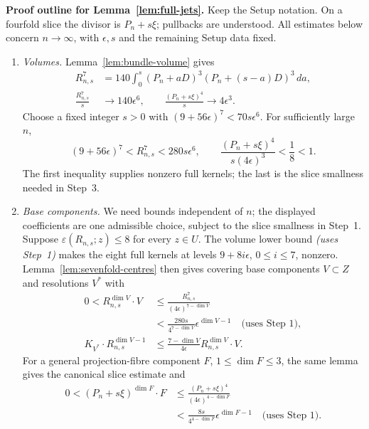 \documentclass[12pt,a4paper,psamsfonts]{amsart}
\theoremstyle{definition}
\theoremstyle{plain}
\begin{document}
\medskip
\noindent\textbf{Proof outline for Lemma~\ref{lem:full-jets}.}
Keep the Setup notation. On a fourfold slice the divisor is
$P_n+s\xi$; pullbacks are understood. All estimates below concern
$n\to\infty$, with $\epsilon,s$ and the remaining Setup data fixed.
\begin{enumerate}
\item \emph{Volumes.} Lemma~\ref{lem:bundle-volume} gives
\[
 \begin{split}
 R_{n,s}^7
  &=140\int_0^s(P_n+aD)^3(P_n+(s-a)D)^3\,da,\\
 \frac{R_{n,s}^7}s&\longrightarrow140\epsilon^6,\qquad
 \frac{(P_n+s\xi)^4}s\longrightarrow4\epsilon^3.
 \end{split}
\]
Choose a fixed integer $s>0$ with $(9+56\epsilon)^7<70s\epsilon^6$.
For sufficiently large $n$,
\[
 (9+56\epsilon)^7<R_{n,s}^7<280s\epsilon^6,\qquad
 \frac{(P_n+s\xi)^4}{s(4\epsilon)^3}<\frac18<1.
\]
The first inequality supplies nonzero full kernels; the last is
the slice smallness needed in Step~3.

\item \emph{Base components.} We need bounds independent of $n$;
the displayed coefficients are one admissible choice, subject to
the slice smallness in Step~1.
Suppose $\varepsilon(R_{n,s};z)\le8$ for every $z\in U$.
The volume lower bound \emph{(uses Step~1)} makes the eight full
kernels at levels $9+8i\epsilon$, $0\le i\le7$, nonzero.
Lemma~\ref{lem:sevenfold-centres} then gives covering base components
$V\subset Z$ and resolutions $V^*$ with
\[
 \begin{split}
 0<R_{n,s}^{\dim V}\cdot V
   &\le\frac{R_{n,s}^7}{(4\epsilon)^{7-\dim V}}\\
   &<\frac{280s}{4^{7-\dim V}}\epsilon^{\dim V-1}
                       \quad\text{(uses Step 1)},\\
 K_{V^*}\cdot R_{n,s}^{\dim V-1}
   &\le\frac{7-\dim V}{4\epsilon}R_{n,s}^{\dim V}\cdot V.
 \end{split}
\]
For a general projection-fibre component $F$, $1\le\dim F\le3$,
the same lemma gives the canonical slice estimate and
\[
 \begin{split}
 0<(P_n+s\xi)^{\dim F}\cdot F
  &\le\frac{(P_n+s\xi)^4}{(4\epsilon)^{4-\dim F}}\\
  &<\frac{8s}{4^{4-\dim F}}\epsilon^{\dim F-1}
                       \quad\text{(uses Step 1)}.
 \end{split}
\]


\end{enumerate}
\end{document}
